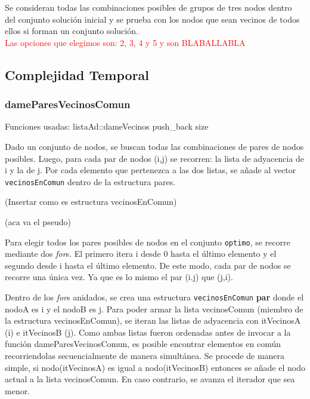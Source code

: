 Se consideran todas las combinaciones posibles de grupos de tres nodos dentro del conjunto soluci\'on inicial y se prueba con los nodos que sean vecinos de todos ellos si forman un conjunto soluci\'on.\\



\textcolor{red}{Las opciones que elegimos son: 2, 3, 4 y 5 y son BLABALLABLA}

\newpage
\subsection{Complejidad Temporal}

\subsubsection{dameParesVecinosComun}\label{vec1}

Funciones usadas:
listaAd::dameVecinos
push_back
size


Dado un conjunto de nodos, se buscan todas las combinaciones de pares de nodos posibles. 
Luego, para cada par de nodos (i,j) se recorren: la lista de adyacencia de i y la de j. 
Por cada elemento que pertenezca a las dos listas, se a\~nade al vector \texttt{vecinosEnComun} dentro de la estructura pares.

(Insertar como es estructura vecinosEnComun)


(aca va el pseudo)

Para elegir todos los pares posibles de nodos en el conjunto \texttt{optimo}, se recorre mediante dos \emph{for}s.
El primero itera i desde 0 hasta el \'ultimo elemento y el segundo desde i hasta el \'ultimo elemento. 
De este modo, cada par de nodos se recorre una \'unica vez. Ya que es lo mismo el par (i.j) que (j,i).

Dentro de los \emph{for}s anidados, se crea una estructura \texttt{vecinosEnComun} \textbf{par} donde el nodoA es i y el nodoB es j. 
Para poder armar la lista vecinosComun (miembro de la estructura vecinosEnComun), se iteran las listas de adyacencia con itVecinosA (i) e itVecinosB (j).
Como ambas listas fueron ordenadas antes de invocar a la funci\'on dameParesVecinosComun, es posible encontrar elementos en com\'un recorriendolas secuencialmente de manera simult\'anea.
Se procede de manera simple, si nodo(itVecinosA) es igual a nodo(itVecinosB) entonces se a\~nade el nodo actual a la lista vecinosComun.
En caso contrario, se avanza el iterador que sea menor.

